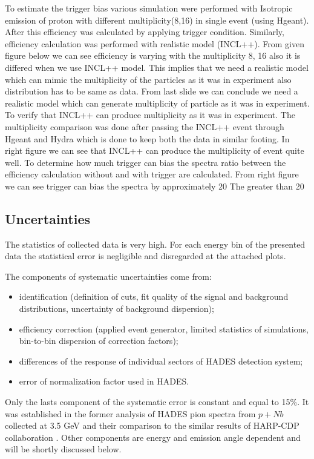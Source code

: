 To estimate the trigger bias various simulation were performed with Isotropic emission  of proton  with different multiplicity(8,16) in single event (using Hgeant). After this efficiency was calculated by applying trigger condition.
Similarly, efficiency calculation was performed with realistic model (INCL++).
From given figure below we can see efficiency is varying with the multiplicity 8, 16 also it is differed when we use INCL++ model. This implies that we need a realistic model which can mimic the multiplicity of the particles as it was in experiment also distribution has to be same as data.
From last slide we can conclude we need a realistic model which can generate multiplicity of particle as it was in experiment.
To verify that INCL++ can produce multiplicity as it was in experiment. The multiplicity comparison was done after passing the INCL++ event through Hgeant and Hydra which is done to keep both the data in similar footing.
In right figure we can see that INCL++ can produce the multiplicity of event quite well.
To determine how much trigger can bias the spectra ratio between the efficiency calculation without and with trigger are calculated.
From right figure we can see trigger can bias the spectra by approximately 20%
The greater than 20%
\subsection{\label{Uncertainties} Uncertainties}

The statistics of collected data is very high. For each energy bin of the presented data the statistical error 
is negligible and disregarded at the attached plots.

The components of systematic uncertainties come from: 
\begin{itemize}
	\item identification (definition of cuts, fit quality of the signal and background distributions, 
	uncertainty of background dispersion); 
	\item efficiency correction (applied event generator, limited statistics of simulations, bin-to-bin 
	dispersion of correction factors);
	\item differences of the response of individual sectors of HADES detection system;
	\item error of normalization factor used in HADES.  
\end{itemize}

Only the lasts component of the systematic error is constant and equal to 15\%. It was established in the former analysis 
of HADES pion spectra from $p+Nb$ collected at 3.5 GeV \cite{AgakishievPionP} and their comparison 
to the similar results of HARP-CDP collaboration \cite{Tlusty}. Other components are energy 
and emission angle dependent and will be shortly discussed below.  

